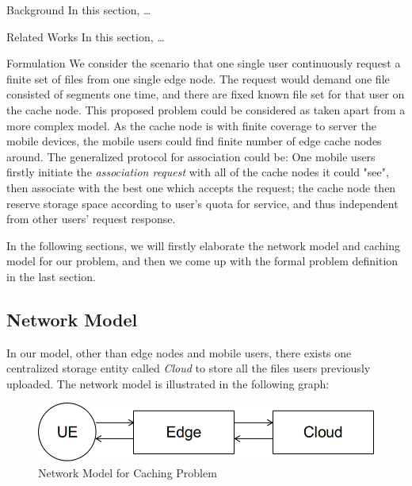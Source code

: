 \documentclass{article}
\begin{document}
\begin{section}{Background}
    \label{background}
    In this section, \dots
\end{section}

\begin{section}{Related Works}
    \label{review}
    In this section, \dots
\end{section}

\begin{section}{Formulation}
    \label{formulation}
    We consider the scenario that one single user continuously request a finite set of files from one single edge node. The request would demand one file consisted of segments one time, and there are fixed known file set for that user on the cache node.
    This proposed problem could be considered as taken apart from a more complex model. As the cache node is with finite coverage to server the mobile devices, the mobile users could find finite number of edge cache nodes around. The generalized protocol for association could be: One mobile users firstly initiate the \textit{association request} with all of the cache nodes it could "see", then associate with the best one which accepts the request; the cache node then reserve storage space according to user's quota for service, and thus independent from other users' request response.
    
    In the following sections, we will firstly elaborate the network model and caching model for our problem, and then we come up with the formal problem definition in the last section.

    \subsection{Network Model}
    \label{net_model}
    In our model, other than edge nodes and mobile users, there exists one centralized storage entity called \emph{Cloud} to store all the files users previously uploaded.
    The network model is illustrated in the following graph:

    \begin{figure}[h!]
        \label{fig:network}
        \centering
        \includegraphics[width=0.8\linewidth]{images/network.png}
        \caption{Network Model for Caching Problem}
    \end{figure}


\end{section}
\end{document}
